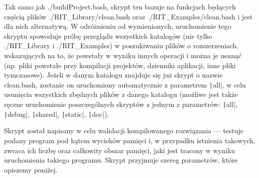 Tak samo jak \textsf{./buildProject.bash}, skrypt ten bazuje na funkcjach będących częścią plików \textsf{./RIT\_Library/clean.bash} oraz \textsf{./RIT\_Examples/clean.bash} i jest dla nich alternatywą. W odróżnieniu od wymienionych, uruchomienie tego skryptu spowoduje próbę przeglądu wszystkich katalogów (nie tylko \textsf{./RIT\_Library} i \textsf{./RIT\_Examples}) w poszukiwaniu plików o rozszerzeniach, wskazujących na to, że powstały w wyniku innych operacji i można je usunąć (np. pliki powstałe przy kompilacji projektów, dzienniki aplikacji, inne pliki tymczasowe). Jeżeli w danym katalogu znajduje się już skrypt o nazwie \textsf{clean.bash}, zostanie on uruchomiony automatycznie z parametrem \texttt|all|, w celu usunięcia wszystkich zbędnych plików z danego katalogu (możliwe jest także ręczne uruchomienie poszczególnych skryptów z jednym z parametrów: \texttt|all|, \texttt|debug|, \texttt|shared|, \texttt|static|, \texttt|doc|).

Skrypt został napisany w celu walidacji kompilowanego rozwiązania --- testuje podany program pod kątem wycieków pamięci i, w przypadku istnienia takowych, zwraca ich liczbę oraz całkowity obszar pamięci, jaki jest tracony w wyniku uruchomienia takiego programu. Skrypt przyjmuje szereg parametrów, które opiszemy poniżej.

